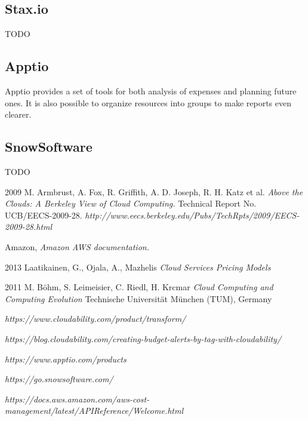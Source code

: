 \documentclass[licencjacka,en]{thesisclass}
\begin{document}
	\subsection{Stax.io}

	TODO

	\subsection{Apptio}

	Apptio provides a set of tools for both analysis of expenses and planning future ones. It
	is also possible to organize resources into groups to make reports even clearer.

	\subsection{SnowSoftware}

	TODO


    
\begin{thebibliography}{99}

    2009 M. Armbrust, A. Fox, R. Griffith, A. D. Joseph, R. H. Katz et al.
    \textit{Above the Clouds: A Berkeley View of Cloud Computing.} 
    Technical Report No. UCB/EECS-2009-28.
    \textit{http://www.eecs.berkeley.edu/Pubs/TechRpts/2009/EECS-2009-28.html}

    Amazon,
    \textit{Amazon AWS documentation.} 
        
    2013 Laatikainen, G., Ojala, A., Mazhelis
    \textit{Cloud Services Pricing Models}

    2011 M. Böhm, S. Leimeisier, C. Riedl, H. Krcmar
    \textit{Cloud Computing and Computing Evolution}
    Technische Universität München (TUM), Germany

    \textit{https://www.cloudability.com/product/transform/}

    \textit{https://blog.cloudability.com/creating-budget-alerts-by-tag-with-cloudability/}

    \textit{https://www.apptio.com/products}

    \textit{https://go.snowsoftware.com/}

    \textit{https://docs.aws.amazon.com/aws-cost-management/latest/APIReference/Welcome.html}

\end{thebibliography}
\end{document}
